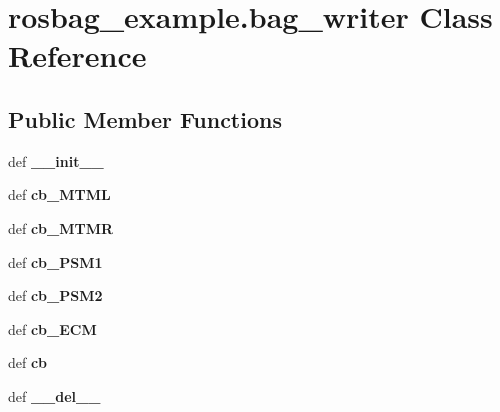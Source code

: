 \hypertarget{classrosbag__example_1_1bag__writer}{\section{rosbag\-\_\-example.\-bag\-\_\-writer Class Reference}
\label{classrosbag__example_1_1bag__writer}
}
\subsection*{Public Member Functions}
\begin{DoxyCompactItemize}
\item 
\hypertarget{classrosbag__example_1_1bag__writer_ac368041d02c78f914bed9c631cc38c90}{def {\bfseries \-\_\-\-\_\-init\-\_\-\-\_\-}}\label{classrosbag__example_1_1bag__writer_ac368041d02c78f914bed9c631cc38c90}

\item 
\hypertarget{classrosbag__example_1_1bag__writer_a3dad455213f5bc06c6866a30890da914}{def {\bfseries cb\-\_\-\-M\-T\-M\-L}}\label{classrosbag__example_1_1bag__writer_a3dad455213f5bc06c6866a30890da914}

\item 
\hypertarget{classrosbag__example_1_1bag__writer_a07611dd2b656c8b92aed41161156671e}{def {\bfseries cb\-\_\-\-M\-T\-M\-R}}\label{classrosbag__example_1_1bag__writer_a07611dd2b656c8b92aed41161156671e}

\item 
\hypertarget{classrosbag__example_1_1bag__writer_aa092fab4718a28591c08fed5b36b4955}{def {\bfseries cb\-\_\-\-P\-S\-M1}}\label{classrosbag__example_1_1bag__writer_aa092fab4718a28591c08fed5b36b4955}

\item 
\hypertarget{classrosbag__example_1_1bag__writer_ad5d65aa5832ba57dfa426295e43eeb68}{def {\bfseries cb\-\_\-\-P\-S\-M2}}\label{classrosbag__example_1_1bag__writer_ad5d65aa5832ba57dfa426295e43eeb68}

\item 
\hypertarget{classrosbag__example_1_1bag__writer_a599756272c44ec06dabfc52c761699fc}{def {\bfseries cb\-\_\-\-E\-C\-M}}\label{classrosbag__example_1_1bag__writer_a599756272c44ec06dabfc52c761699fc}

\item 
\hypertarget{classrosbag__example_1_1bag__writer_a4cdfcace7c76a58b39360d97969f11fc}{def {\bfseries cb}}\label{classrosbag__example_1_1bag__writer_a4cdfcace7c76a58b39360d97969f11fc}

\item 
\hypertarget{classrosbag__example_1_1bag__writer_a1c5fc68b00b94b60173e9ec82a0dca88}{def {\bfseries \-\_\-\-\_\-del\-\_\-\-\_\-}}\label{classrosbag__example_1_1bag__writer_a1c5fc68b00b94b60173e9ec82a0dca88}

\end{DoxyCompactItemize}
